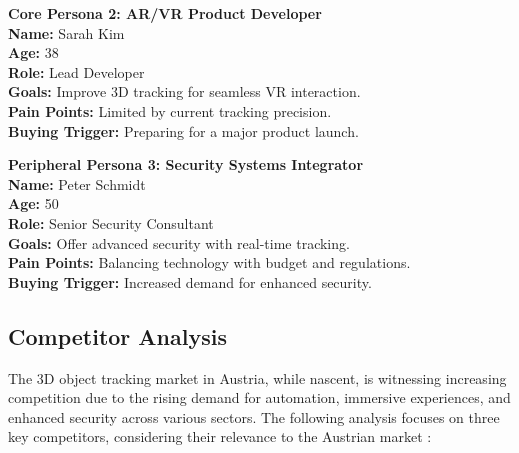 \textbf{Core Persona 2: AR/VR Product Developer} \\
\textbf{Name:} Sarah Kim \\
\textbf{Age:} 38 \\
\textbf{Role:} Lead Developer \\
\textbf{Goals:} Improve 3D tracking for seamless VR interaction. \\
\textbf{Pain Points:} Limited by current tracking precision. \\
\textbf{Buying Trigger:} Preparing for a major product launch.

\textbf{Peripheral Persona 3: Security Systems Integrator} \\
\textbf{Name:} Peter Schmidt \\
\textbf{Age:} 50 \\
\textbf{Role:} Senior Security Consultant \\
\textbf{Goals:} Offer advanced security with real-time tracking. \\
\textbf{Pain Points:} Balancing technology with budget and regulations. \\
\textbf{Buying Trigger:} Increased demand for enhanced security.

\subsection{Competitor Analysis}

The 3D object tracking market in Austria, while nascent, is witnessing increasing competition due to the rising demand for automation, immersive experiences, and enhanced security across various sectors. The following analysis focuses on three key competitors, considering their relevance to the Austrian market \cite{businessresearchinsights_3d_motion_capture_market}:

